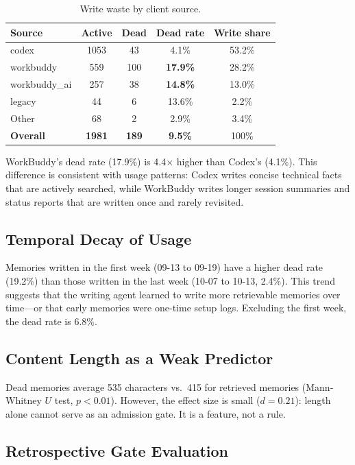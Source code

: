 \documentclass[11pt]{article}
\begin{document}
\begin{table}[h]
\centering
\caption{Write waste by client source.}
\label{tab:source_waste}
\begin{tabular}{lcccc}
\toprule
Source & Active & Dead & Dead rate & Write share \\
\midrule
codex & 1053 & 43 & 4.1\% & 53.2\% \\
workbuddy & 559 & 100 & \textbf{17.9\%} & 28.2\% \\
workbuddy\_ai & 257 & 38 & \textbf{14.8\%} & 13.0\% \\
legacy & 44 & 6 & 13.6\% & 2.2\% \\
Other & 68 & 2 & 2.9\% & 3.4\% \\
\midrule
\textbf{Overall} & \textbf{1981} & \textbf{189} & \textbf{9.5\%} & 100\% \\
\bottomrule
\end{tabular}
\end{table}

WorkBuddy's dead rate (17.9\%) is 4.4$\times$ higher than Codex's (4.1\%). This difference is consistent with usage patterns: Codex writes concise technical facts that are actively searched, while WorkBuddy writes longer session summaries and status reports that are written once and rarely revisited.

\subsection{Temporal Decay of Usage}

Memories written in the first week (09-13 to 09-19) have a higher dead rate (19.2\%) than those written in the last week (10-07 to 10-13, 2.4\%). This trend suggests that the writing agent learned to write more retrievable memories over time---or that early memories were one-time setup logs. Excluding the first week, the dead rate is 6.8\%.

\subsection{Content Length as a Weak Predictor}

Dead memories average 535 characters vs.\ 415 for retrieved memories (Mann-Whitney $U$ test, $p < 0.01$). However, the effect size is small ($d = 0.21$): length alone cannot serve as an admission gate. It is a feature, not a rule.

\subsection{Retrospective Gate Evaluation}
\end{document}
